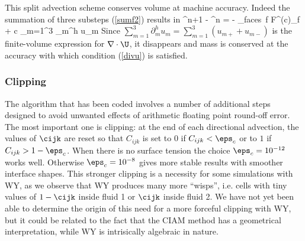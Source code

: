This split advection scheme conserves volume at machine accuracy. 
Indeed the summation of three substeps (\ref{sumf2}) results in 
\be
{\cijk^{n+1} - \cijk^{n}} = - \sum_{\rm{faces}\, f} F^{(c)}_f 
+ c \sum_{m=1}^{3} \partial_{m}^h u_m \label{sumfall2}
\nd
Since $\sum_{m=1}^{3} \partial_{m}^h u_m = \sum_{m=1}^{3} (u_{m+}  + u_{m-}) $ is 
the finite-volume expression for $\nabla \cdot \U$, it disappears and mass 
is conserved at the 
accuracy with which condition (\ref{divu}) is satisfied. 

\subsubsection{Clipping}
\label{clipping}

The algorithm that has been coded involves a number of additional
steps designed to avoid unwanted effects of arithmetic floating point
round-off error. The most important one is clipping: at the end of
each directional advection, the values of $\cijk$ are reset so that
$C_{ijk}$ is set to $0$ if $C_{ijk} < \eps_c$ or to
$1$ if $C_{ijk} > 1 - \eps_c$. When there is no surface tension 
the choice $\eps_c = 10^{-12}$ works well.
Otherwise $\eps_c = 10^{-8}$ gives more stable results with smoother
interface shapes. This stronger clipping is a necessity for some
simulations with WY, as we observe that WY produces many more ``wisps'', 
i.e. cells with tiny values of $1-\cijk$
inside fluid 1 or $\cijk$ inside fluid 2.
We have not yet been able to determine the origin of this need for a more
forceful clipping with WY, but it could be related to the fact that the
CIAM method has a geometrical interpretation, while WY is intrisically algebraic
in nature.
